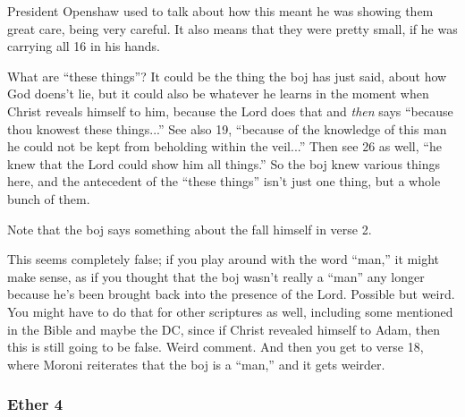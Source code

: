 		\begin{compactdesc}
		
		\item[1$\vert$]
		\begin{compactdesc}
		\item[carry them in his hands] President Openshaw used to talk about how this meant he was showing them great care, being very careful. It also means that they were pretty small, if he was carrying all 16 in his hands.
		\end{compactdesc}
		
		\item[13$\vert$]
		\begin{compactdesc}
		\item[because thou knowest these things] What are ``these things''? It could be the thing the boj has just said, about how God doens't lie, but it could also be whatever he learns in the moment when Christ reveals himself to him, because the Lord does that and \textit{then} says ``because thou knowest these things...'' See also 19, ``because of the knowledge of this man he could not be kept from beholding within the veil...'' Then see 26 as well, ``he knew that the Lord could show him all things.'' So the boj knew various things here, and the antecedent of the ``these things'' isn't just one thing, but a whole bunch of them.
		\item[the fall] Note that the boj says something about the fall himself in verse 2.
		\end{compactdesc}
		
		\item[15$\vert$]
		\begin{compactdesc}
		\item[never have I showed myself unto man whom I have created] This seems completely false; if you play around with the word ``man,'' it might make sense, as if you thought that the boj wasn't really a ``man'' any longer because he's been brought back into the presence of the Lord. Possible but weird. You might have to do that for other scriptures as well, including some mentioned in the Bible and maybe the DC, since if Christ revealed himself to Adam, then this is still going to be false. Weird comment.
		And then you get to verse 18, where Moroni reiterates that the boj is a ``man,'' and it gets weirder.
		\end{compactdesc}
		
		\end{compactdesc}
		
	\subsubsection{Ether 4} %
	
